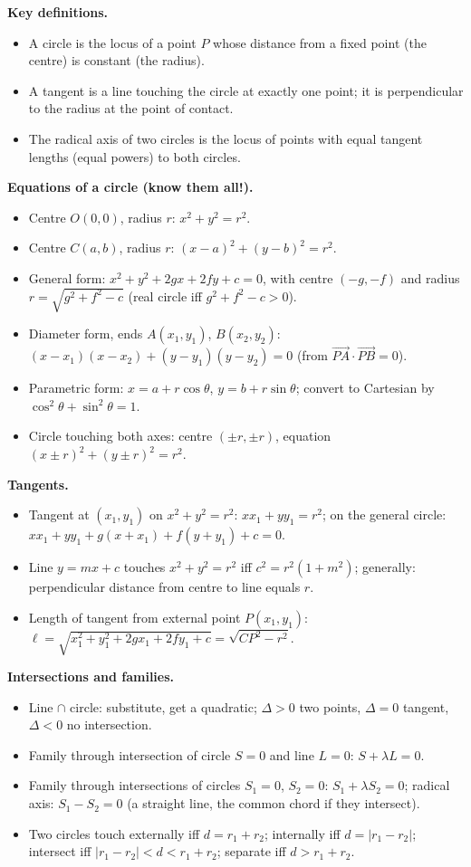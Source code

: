 \documentclass[11pt]{article}
\newcommand{\cle}[1]{{\popxbold\color{popdark}#1}}
\begin{document}
\begin{aretenir}
\textbf{Key definitions.}
\begin{itemize}
\item A \cle{circle} is the locus of a point $P$ whose distance from a fixed point (the \cle{centre}) is constant (the \cle{radius}).
\item A \cle{tangent} is a line touching the circle at exactly one point; it is perpendicular to the radius at the point of contact.
\item The \cle{radical axis} of two circles is the locus of points with equal tangent lengths (equal powers) to both circles.
\end{itemize}

\textbf{Equations of a circle (know them all!).}
\begin{itemize}
\item Centre $O(0,0)$, radius $r$: $x^2+y^2=r^2$.
\item Centre $C(a,b)$, radius $r$: $(x-a)^2+(y-b)^2=r^2$.
\item General form: $x^2+y^2+2gx+2fy+c=0$, with centre $(-g,-f)$ and radius $r=\sqrt{g^2+f^2-c}$ (real circle iff $g^2+f^2-c>0$).
\item Diameter form, ends $A(x_1,y_1)$, $B(x_2,y_2)$: $(x-x_1)(x-x_2)+(y-y_1)(y-y_2)=0$ (from $\vec{PA}\cdot\vec{PB}=0$).
\item Parametric form: $x=a+r\cos\theta$, $y=b+r\sin\theta$; convert to Cartesian by $\cos^2\theta+\sin^2\theta=1$.
\item Circle touching both axes: centre $(\pm r,\pm r)$, equation $(x\pm r)^2+(y\pm r)^2=r^2$.
\end{itemize}

\textbf{Tangents.}
\begin{itemize}
\item Tangent at $(x_1,y_1)$ on $x^2+y^2=r^2$: $xx_1+yy_1=r^2$; on the general circle: $xx_1+yy_1+g(x+x_1)+f(y+y_1)+c=0$.
\item Line $y=mx+c$ touches $x^2+y^2=r^2$ iff $c^2=r^2(1+m^2)$; generally: perpendicular distance from centre to line equals $r$.
\item Length of tangent from external point $P(x_1,y_1)$: $\ell=\sqrt{x_1^2+y_1^2+2gx_1+2fy_1+c}=\sqrt{CP^2-r^2}$.
\end{itemize}

\textbf{Intersections and families.}
\begin{itemize}
\item Line $\cap$ circle: substitute, get a quadratic; $\Delta>0$ two points, $\Delta=0$ tangent, $\Delta<0$ no intersection.
\item Family through intersection of circle $S=0$ and line $L=0$: $S+\lambda L=0$.
\item Family through intersections of circles $S_1=0$, $S_2=0$: $S_1+\lambda S_2=0$; radical axis: $S_1-S_2=0$ (a straight line, the common chord if they intersect).
\item Two circles touch externally iff $d=r_1+r_2$; internally iff $d=|r_1-r_2|$; intersect iff $|r_1-r_2|<d<r_1+r_2$; separate iff $d>r_1+r_2$.
\end{itemize}


\end{aretenir}
\end{document}
